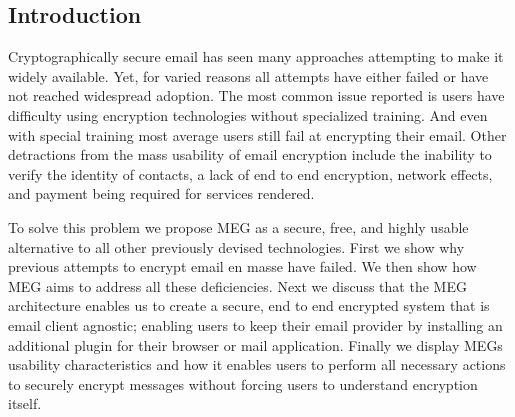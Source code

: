 \documentclass[10pt]{article}
\begin{document}
\begin{multicols}{2}
\section{Introduction}
\par Cryptographically secure email has seen many approaches attempting to make it widely available. Yet, for varied reasons all attempts have either failed or have not reached widespread adoption. The most common issue reported is users have difficulty using encryption technologies without specialized training. And even with special training most average users still fail at encrypting their email\cite{whitten1999johnny}. Other detractions from the mass usability of email encryption include the inability to verify the identity of contacts, a lack of end to end encryption, network effects, and payment being required for services rendered.
\par To solve this problem we propose MEG as a secure, free, and highly usable alternative to all other previously devised technologies. First we show why previous attempts to encrypt email en masse have failed. We then show how MEG aims to address all these deficiencies. Next we discuss that the MEG architecture enables us to create a secure, end to end encrypted system that is email client agnostic; enabling users to keep their email provider by installing an additional plugin for their browser or mail application. Finally we display MEGs usability characteristics and how it enables users to perform all necessary actions to securely encrypt messages without forcing users to understand encryption itself.

\end{multicols}
\end{document}
